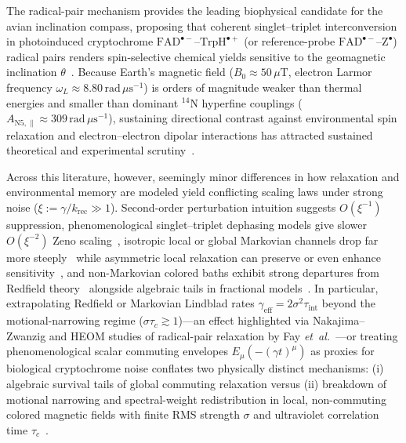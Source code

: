 \documentclass[twocolumn,10pt,amsmath,amssymb,floatfix]{revtex4-2}
\theoremstyle{plain}
\theoremstyle{definition}
\begin{document}
The radical-pair mechanism provides the leading biophysical candidate for the avian inclination compass, proposing that coherent singlet--triplet interconversion in photoinduced cryptochrome $\mathrm{FAD}^{\bullet-}\text{--}\mathrm{TrpH}^{\bullet+}$ (or reference-probe $\mathrm{FAD}^{\bullet-}\text{--}\mathrm{Z}^{\bullet}$) radical pairs renders spin-selective chemical yields sensitive to the geomagnetic inclination $\theta$~\cite{Schulten1978ZPC,Steiner1989ChemRev,Timmel1998MolPhys,Ritz2000BJ,Ritz2004Nature,Lee2014JRSocInterface,Hore2016ARB,Xu2021Nature}. Because Earth's magnetic field ($B_0 \approx 50\,\mu\text{T}$, electron Larmor frequency $\omega_L \approx 8.80\,\text{rad}\,\mu\text{s}^{-1}$) is orders of magnitude weaker than thermal energies and smaller than dominant $^{14}\text{N}$ hyperfine couplings ($A_{\mathrm{N5},\parallel} \approx 309\,\text{rad}\,\mu\text{s}^{-1}$), sustaining directional contrast against environmental spin relaxation and electron--electron dipolar interactions has attracted sustained theoretical and experimental scrutiny~\cite{Efimova2008BJ,Kominis2009PRE,Jones2010CPL,Cai2010PRL,Gauger2011PRL,Tiersch2012PhilTrans,Hogben2012PRL,Worster2016JCP,Hiscock2016PNAS,Kattnig2016PCCP,Kattnig2016NJP,Fay2018JCP,Fay2019JCP,Fay2020Faraday,Babcock2020JPCL}.

Across this literature, however, seemingly minor differences in how relaxation and environmental memory are modeled yield conflicting scaling laws under strong noise ($\xi := \gamma/k_{\mathrm{rec}} \gg 1$). Second-order perturbation intuition suggests $O(\xi^{-1})$ suppression, phenomenological singlet--triplet dephasing models give slower $O(\xi^{-2})$ Zeno scaling~\cite{Dellis2012Biosystems,Tiersch2012PhilTrans}, isotropic local or global Markovian channels drop far more steeply~\cite{Worster2016JCP,Kattnig2016PCCP} while asymmetric local relaxation can preserve or even enhance sensitivity~\cite{Tiersch2012PhilTrans,Kattnig2016NJP}, and non-Markovian colored baths exhibit strong departures from Redfield theory~\cite{Fay2019JCP,Tanimura2020JCP} alongside algebraic tails in fractional models~\cite{Metzler2000PR,Sokolov2001PRE,Pollard1948BAMS,Gorenflo2002FCAA}. In particular, extrapolating Redfield or Markovian Lindblad rates $\gamma_{\mathrm{eff}} = 2\sigma^2\tau_{\mathrm{int}}$ beyond the motional-narrowing regime ($\sigma\tau_c \gtrsim 1$)---an effect highlighted via Nakajima--Zwanzig and HEOM studies of radical-pair relaxation by Fay \emph{et~al.}~\cite{Fay2019JCP}---or treating phenomenological scalar commuting envelopes $E_\mu(-(\gamma t)^\mu)$ as proxies for biological cryptochrome noise conflates two physically distinct mechanisms: (i) algebraic survival tails of global commuting relaxation versus (ii) breakdown of motional narrowing and spectral-weight redistribution in local, non-commuting colored magnetic fields with finite RMS strength $\sigma$ and ultraviolet correlation time $\tau_c$~\cite{Schulten1978JCP,Kattnig2016PCCP,Kattnig2016NJP,Fay2019JCP,Fay2020Faraday}.
\end{document}
